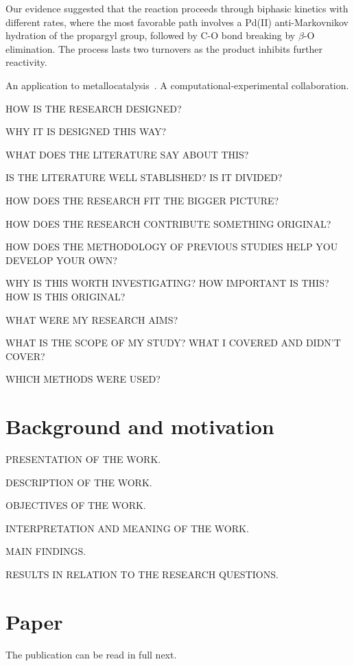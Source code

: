 Our evidence suggested that the reaction proceeds through biphasic kinetics
with different rates, where the most favorable path involves a Pd(II)
anti-Markovnikov hydration of the propargyl group, followed by C-O bond breaking
by $\beta$-O elimination.
The process lasts two turnovers as the product inhibits further
reactivity.

An application to metallocatalysis~\cite{Coelho2019}.
A computational-experimental collaboration.


HOW IS THE RESEARCH DESIGNED?\@

WHY IT IS DESIGNED THIS WAY?\@




WHAT DOES THE LITERATURE SAY ABOUT THIS?\@

IS THE LITERATURE WELL STABLISHED?\@
IS IT DIVIDED?\@

HOW DOES THE RESEARCH FIT THE BIGGER PICTURE?\@

HOW DOES THE RESEARCH CONTRIBUTE SOMETHING ORIGINAL?\@

HOW DOES THE METHODOLOGY OF PREVIOUS STUDIES HELP YOU DEVELOP YOUR OWN?\@







WHY IS THIS WORTH INVESTIGATING?\@
HOW IMPORTANT IS THIS?\@
HOW IS THIS ORIGINAL?\@

WHAT WERE MY RESEARCH AIMS?\@

WHAT IS THE SCOPE OF MY STUDY?\@
WHAT I COVERED AND DIDN'T COVER?\@

WHICH METHODS WERE USED?\@




\section{Background and motivation}

PRESENTATION OF THE WORK.\@

DESCRIPTION OF THE WORK.\@

OBJECTIVES OF THE WORK.\@

INTERPRETATION AND MEANING OF THE WORK.\@

MAIN FINDINGS.\@

RESULTS IN RELATION TO THE RESEARCH QUESTIONS.\@

\section{Paper}

The publication can be read in full next.


